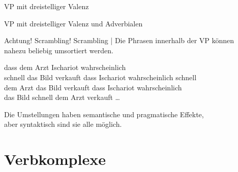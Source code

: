\begin{frame}
  {VP mit dreistelliger Valenz}
  \centering 
\end{frame}

\begin{frame}
  {VP mit dreistelliger Valenz und Adverbialen}
  \centering 
\end{frame}

\begin{frame}
  {Achtung! Scrambling!}
  \onslide<+->
  \onslide<+->
  \alert{Scrambling} | Die Phrasen innerhalb der VP können\\
  nahezu beliebig umsortiert werden.\\
  \Zeile
  \onslide<+->
  \begin{exe}
    \ex dass dem Arzt Ischariot wahrscheinlich\\
    schnell das Bild verkauft
    \ex dass Ischariot wahrscheinlich schnell\\
    dem Arzt das Bild verkauft
    \ex dass Ischariot wahrscheinlich\\
    das Bild schnell dem Arzt verkauft
    \ex \ldots
  \end{exe}
  \onslide<+->
  \Zeile
  Die Umstellungen haben \alert{semantische und pragmatische Effekte},\\
  aber syntaktisch sind sie alle möglich.
\end{frame}

\section{Verbkomplexe}

